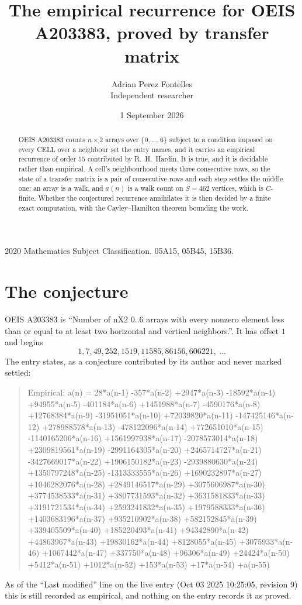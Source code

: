 \documentclass[11pt,a4paper]{article}
\title{The empirical recurrence for OEIS A203383, proved by transfer matrix}
\author{Adrian Perez Fontelles\\ \small Independent researcher}
\date{1 September 2026}
\theoremstyle{plain}
\theoremstyle{definition}
\begin{document}
\maketitle

\begin{abstract}
OEIS A203383 counts $n\times2$ arrays over $\{0,\dots,6\}$ subject to a condition imposed on
every CELL over a neighbour set the entry names, and it carries an empirical recurrence of
order $55$ contributed by R.~H.~Hardin. It is true, and it is decidable rather than
empirical. A cell's neighbourhood meets three consecutive rows, so the state of a transfer
matrix is a pair of consecutive rows and each step settles the middle one; an array is a
walk, and $a(n)$ is a walk count on $S=462$ vertices, which is $C$-finite. Whether the
conjectured recurrence annihilates it is then decided by a finite exact computation, with the
Cayley--Hamilton theorem bounding the work.
\end{abstract}

\noindent\small 2020 Mathematics Subject Classification. 05A15, 05B45, 15B36.\normalsize

\section{The conjecture}

OEIS A203383 is ``Number of nX2 0..6 arrays with every nonzero element less than or equal to at least two horizontal and vertical neighbors.''. It has offset $1$ and begins
\[
1, 7, 49, 252, 1519, 11585, 86156, 606221,\ \dots
\]
The entry states, as a conjecture contributed by its author and never marked settled:
\begin{quote}
Empirical: a(n) = 28*a(n-1) -357*a(n-2) +2947*a(n-3) -18592*a(n-4) +94955*a(n-5) -401184*a(n-6) +1451988*a(n-7) -4590176*a(n-8) +12768384*a(n-9) -31951051*a(n-10) +72039820*a(n-11) -147425146*a(n-12) +278988578*a(n-13) -478122096*a(n-14) +772651010*a(n-15) -1140165206*a(n-16) +1561997938*a(n-17) -2078573014*a(n-18) +2309819561*a(n-19) -2991164305*a(n-20) +2465714727*a(n-21) -3427669017*a(n-22) +1906150182*a(n-23) -2939880630*a(n-24) +1350797248*a(n-25) -1313333555*a(n-26) +1690232897*a(n-27) +1046282076*a(n-28) +2849146517*a(n-29) +3075606987*a(n-30) +3774538533*a(n-31) +3807731593*a(n-32) +3631581833*a(n-33) +3191721534*a(n-34) +2593241832*a(n-35) +1979588333*a(n-36) +1403683196*a(n-37) +935210902*a(n-38) +582152845*a(n-39) +339405509*a(n-40) +185220493*a(n-41) +94342890*a(n-42) +44863967*a(n-43) +19830162*a(n-44) +8128055*a(n-45) +3075933*a(n-46) +1067442*a(n-47) +337750*a(n-48) +96306*a(n-49) +24424*a(n-50) +5412*a(n-51) +1012*a(n-52) +153*a(n-53) +17*a(n-54) +a(n-55)
\end{quote}
As of the ``Last modified'' line on the live entry (Oct 03 2025 10:25:05, revision 9) this is still
recorded as empirical, and nothing on the entry records it as proved.
\end{document}
